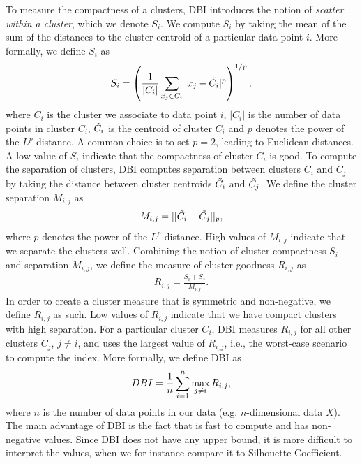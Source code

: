 To measure the compactness of a clusters, DBI introduces the notion of \textit{scatter within a cluster}, which we denote $S_i$. We compute $S_i$ by taking the mean of the sum of the distances to the cluster centroid of a particular data point $i$. More formally, we define $S_i$ as
\begin{align}
    S_i = \left( \frac{1}{|C_i|} \sum\limits_{x_j \in C_i}^{} |x_j - \Tilde{C_i}|^p\right)^{1/p},
    \label{eqn:dbi-s}
\end{align}
where $C_i$ is the cluster we associate to data point $i$, $|C_i|$ is the number of data points in cluster $C_i$, $\Tilde{C_i}$ is the centroid of cluster $C_i$ and $p$ denotes the power of the $L^p$ distance. A common choice is to set $p=2$, leading to Euclidean distances. A low value of $S_i$ indicate that the compactness of cluster $C_i$ is good. To compute the separation of clusters, DBI computes separation between clusters $C_i$ and $C_j$ by taking the distance between cluster centroids $\Tilde{C_i}$ and $\Tilde{C_j}$. We define the cluster separation $M_{i, j}$ as
\begin{align}
    M_{i, j} = ||\Tilde{C_i} - \Tilde{C_j}||_p,
    \label{eqn:dbi-m}
\end{align}
where $p$ denotes the power of the $L^p$ distance. High values of $M_{i, j}$ indicate that we separate the clusters well. Combining the notion of cluster compactness $S_i$ and separation $M_{i, j}$, we define the measure of cluster goodness $R_{i, j}$ as
\begin{align}
    R_{i, j} = \frac{S_i + S_j}{M_{i, j}}.
    \label{eqn:dbi-r}
\end{align}
In order to create a cluster measure that is symmetric and non-negative, we define $R_{i, j}$ as such. Low values of $R_{i, j}$ indicate that we have compact clusters with high separation. For a particular cluster $C_i$, DBI measures $R_{i, j}$ for all other clusters $C_j$, $j \neq i$, and uses the largest value of $R_{i, j}$, i.e., the worst-case scenario to compute the index. More formally, we define DBI as
\begin{align}
    DBI = \frac{1}{n} \sum\limits_{i=1}^{n} \max_{j \neq i} R_{i, j},
    \label{eqn:dbi}
\end{align}
where $n$ is the number of data points in our data (e.g. $n$-dimensional data $X$). The main advantage of DBI is the fact that is fast to compute and has non-negative values. Since DBI does not have any upper bound, it is more difficult to interpret the values, when we for instance compare it to Silhouette Coefficient.


